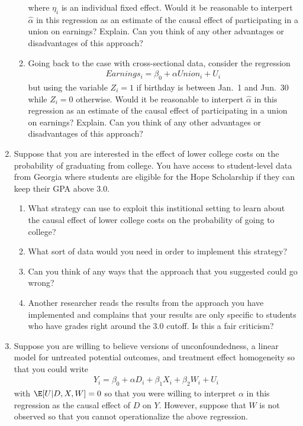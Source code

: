\documentclass[
  letterpaper,
  DIV=11,
  numbers=noendperiod]{scrreprt}
\begin{document}
\begin{enumerate}
\begin{enumerate}
    where \(\eta_i\) is an individual fixed effect. Would it be
    reasonable to interpert \(\hat{\alpha}\) in this regression as an
    estimate of the causal effect of participating in a union on
    earnings? Explain. Can you think of any other advantages or
    disadvantages of this approach?
  \item
    Going back to the case with cross-sectional data, consider the
    regression \begin{align*}
       Earnings_i = \beta_0 + \alpha Union_i + U_i
     \end{align*} but using the variable \(Z_i = 1\) if birthday is
    between Jan.~1 and Jun.~30 while \(Z_i=0\) otherwise. Would it be
    reasonable to interpert \(\hat{\alpha}\) in this regression as an
    estimate of the causal effect of participating in a union on
    earnings? Explain. Can you think of any other advantages or
    disadvantages of this approach?
  \end{enumerate}
\item
  Suppose that you are interested in the effect of lower college costs
  on the probability of graduating from college. You have access to
  student-level data from Georgia where students are eligible for the
  Hope Scholarship if they can keep their GPA above 3.0.

  \begin{enumerate}
  \def\labelenumii{\alph{enumii})}
  \item
    What strategy can use to exploit this institional setting to learn
    about the causal effect of lower college costs on the probability of
    going to college?
  \item
    What sort of data would you need in order to implement this
    strategy?
  \item
    Can you think of any ways that the approach that you suggested could
    go wrong?
  \item
    Another researcher reads the results from the approach you have
    implemented and complains that your results are only specific to
    students who have grades right around the 3.0 cutoff. Is this a fair
    criticism?
  \end{enumerate}
\item
  Suppose you are willing to believe versions of unconfoundedness, a
  linear model for untreated potential outcomes, and treatment effect
  homogeneity so that you could write \begin{align*}
    Y_i = \beta_0 + \alpha D_i + \beta_1 X_i + \beta_2 W_i + U_i
  \end{align*} with \(\E[U|D,X,W] = 0\) so that you were willing to
  interpret \(\alpha\) in this regression as the causal effect of \(D\)
  on \(Y\). However, suppose that \(W\) is not observed so that you
  cannot operationalize the above regression.


\end{enumerate}
\end{document}
